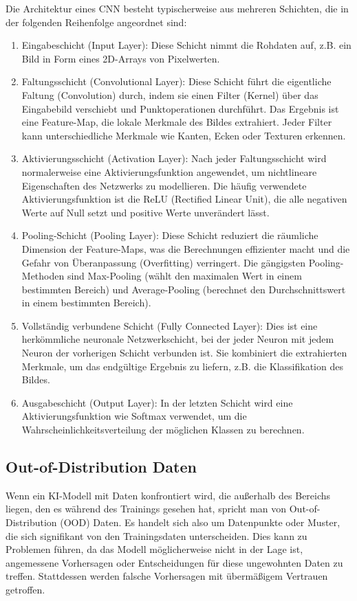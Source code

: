 Die Architektur eines CNN besteht typischerweise aus mehreren Schichten, die in der folgenden Reihenfolge angeordnet sind:

\begin{enumerate}[]
	\item Eingabeschicht (Input Layer): Diese Schicht nimmt die Rohdaten auf, z.B. ein Bild in Form eines 2D-Arrays von Pixelwerten.
	\item Faltungsschicht (Convolutional Layer): Diese Schicht führt die eigentliche Faltung (Convolution) durch, indem sie einen Filter (Kernel) über das Eingabebild verschiebt und Punktoperationen durchführt. Das Ergebnis ist eine Feature-Map, die lokale Merkmale des Bildes extrahiert. Jeder Filter kann unterschiedliche Merkmale wie Kanten, Ecken oder Texturen erkennen.
	\item Aktivierungsschicht (Activation Layer): Nach jeder Faltungsschicht wird normalerweise eine Aktivierungsfunktion angewendet, um nichtlineare Eigenschaften des Netzwerks zu modellieren. Die häufig verwendete Aktivierungsfunktion ist die ReLU (Rectified Linear Unit), die alle negativen Werte auf Null setzt und positive Werte unverändert lässt.
	\item Pooling-Schicht (Pooling Layer): Diese Schicht reduziert die räumliche Dimension der Feature-Maps, was die Berechnungen effizienter macht und die Gefahr von Überanpassung (Overfitting) verringert. Die gängigsten Pooling-Methoden sind Max-Pooling (wählt den maximalen Wert in einem bestimmten Bereich) und Average-Pooling (berechnet den Durchschnittswert in einem bestimmten Bereich).
	\item Vollständig verbundene Schicht (Fully Connected Layer): Dies ist eine herkömmliche neuronale Netzwerkschicht, bei der jeder Neuron mit jedem Neuron der vorherigen Schicht verbunden ist. Sie kombiniert die extrahierten Merkmale, um das endgültige Ergebnis zu liefern, z.B. die Klassifikation des Bildes.
	\item Ausgabeschicht (Output Layer): In der letzten Schicht wird eine Aktivierungsfunktion wie Softmax verwendet, um die Wahrscheinlichkeitsverteilung der möglichen Klassen zu berechnen.
\end{enumerate}

\subsection{Out-of-Distribution Daten}

Wenn ein KI-Modell mit Daten konfrontiert wird, die außerhalb des Bereichs liegen, den es während des Trainings gesehen hat, spricht man von Out-of-Distribution (OOD) Daten. Es handelt sich also um Datenpunkte oder Muster, die sich signifikant von den Trainingsdaten unterscheiden. Dies kann zu Problemen führen, da das Modell möglicherweise nicht in der Lage ist, angemessene Vorhersagen oder Entscheidungen für diese ungewohnten Daten zu treffen. Stattdessen werden falsche Vorhersagen mit übermäßigem Vertrauen getroffen.


